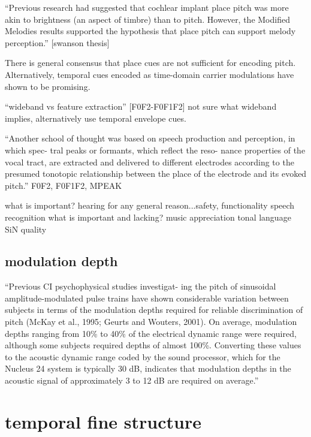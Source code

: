 \documentclass [11pt, proquest] {uwthesis}[2015/03/03]
\begin{document}
``Previous research had suggested that cochlear implant place pitch was more akin to brightness (an aspect of timbre) than to pitch. However, the Modified Melodies results supported the hypothesis that place pitch can support melody perception.'' [swanson thesis]

There is general consensus that place cues are not sufficient for encoding pitch.  Alternatively, temporal cues encoded as time-domain carrier modulations have shown to be promising.


``wideband vs feature extraction'' [F0F2-F0F1F2]
not sure what wideband implies, alternatively use temporal envelope cues.

``Another school of thought was based on speech production and perception, in which spec- tral peaks or formants, which reflect the reso- nance properties of the vocal tract, are extracted and delivered to different electrodes according to the presumed tonotopic relationship between the place of the electrode and its evoked pitch.'' %
F0F2, F0F1F2, MPEAK

    what is important?
        hearing for any general reason...safety, functionality
        speech recognition
    what is important and lacking?
        music appreciation
        tonal language
        SiN
        quality

\subsection{modulation depth}

``Previous CI psychophysical studies investigat- ing the pitch of sinusoidal amplitude-modulated pulse trains have shown considerable variation between subjects in terms of the modulation depths required for reliable discrimination of pitch (McKay et al., 1995; Geurts and Wouters, 2001). On average, modulation depths ranging from 10\% to 40\% of the electrical dynamic range were required, although some subjects required depths of almost 100\%. Converting these values to the acoustic dynamic range coded by the sound processor, which for the Nucleus 24 system is typically 30 dB, indicates that modulation depths in the acoustic signal of approximately 3 to 12 dB are required on average.'' %

\section{temporal fine structure}
\end{document}
